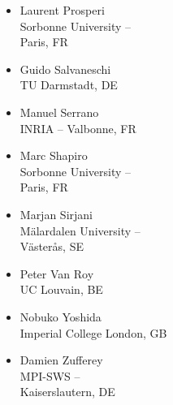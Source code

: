 \documentclass[a4paper,UKenglish]{dagrep-v2018}
\begin{document}
\begin{multicols}{3}
\begin{itemize}
  \item Laurent Prosperi\\Sorbonne University -- \\Paris, FR
  \item Guido Salvaneschi\\TU Darmstadt, DE
  \item Manuel Serrano\\INRIA -- Valbonne, FR
  \item Marc Shapiro\\Sorbonne University -- \\Paris, FR
  \item Marjan Sirjani\\M{\"a}lardalen University -- \\V{\"a}ster{\aa}s, SE
  \item Peter Van Roy\\UC Louvain, BE
  \item Nobuko Yoshida\\Imperial College London, GB
  \item Damien Zufferey\\MPI-SWS -- \\Kaiserslautern, DE
  \end{itemize}
\end{multicols}
\end{document}
